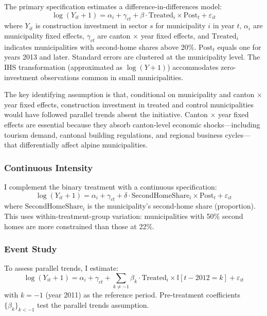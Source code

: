\documentclass[12pt]{article}
\newcommand{\ind}{\mathbb{I}}
\begin{document}
The primary specification estimates a difference-in-differences model:
\begin{equation}
\log(Y_{it} + 1) = \alpha_i + \gamma_{ct} + \beta \cdot \text{Treated}_i \times \text{Post}_t + \varepsilon_{it}
\label{eq:did}
\end{equation}
where $Y_{it}$ is construction investment in sector $s$ for municipality $i$ in year $t$, $\alpha_i$ are municipality fixed effects, $\gamma_{ct}$ are canton $\times$ year fixed effects, and $\text{Treated}_i$ indicates municipalities with second-home shares above 20\%. $\text{Post}_t$ equals one for years 2013 and later. Standard errors are clustered at the municipality level. The IHS transformation (approximated as $\log(Y+1)$) accommodates zero-investment observations common in small municipalities.

The key identifying assumption is that, conditional on municipality and canton $\times$ year fixed effects, construction investment in treated and control municipalities would have followed parallel trends absent the initiative. Canton $\times$ year fixed effects are essential because they absorb canton-level economic shocks---including tourism demand, cantonal building regulations, and regional business cycles---that differentially affect alpine municipalities.

\subsubsection*{Continuous Intensity} I complement the binary treatment with a continuous specification:
\begin{equation}
\log(Y_{it} + 1) = \alpha_i + \gamma_{ct} + \delta \cdot \text{SecondHomeShare}_i \times \text{Post}_t + \varepsilon_{it}
\label{eq:intensity}
\end{equation}
where $\text{SecondHomeShare}_i$ is the municipality's second-home share (proportion). This uses within-treatment-group variation: municipalities with 50\% second homes are more constrained than those at 22\%.

\subsubsection*{Event Study} To assess parallel trends, I estimate:
\begin{equation}
\log(Y_{it} + 1) = \alpha_i + \gamma_{ct} + \sum_{k \neq -1} \beta_k \cdot \text{Treated}_i \times \ind[t - 2012 = k] + \varepsilon_{it}
\label{eq:eventstudy}
\end{equation}
with $k = -1$ (year 2011) as the reference period. Pre-treatment coefficients $\{\beta_k\}_{k < -1}$ test the parallel trends assumption.
\end{document}
